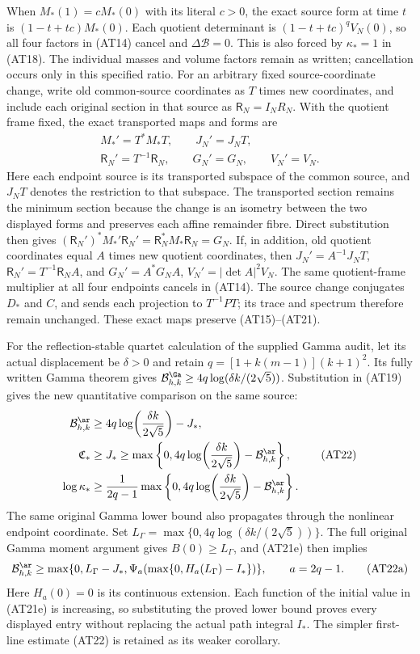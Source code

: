 When $M_*(1)=cM_*(0)$ with its literal $c>0$, the exact source
form at time $t$ is $(1-t+tc)M_*(0)$. Each quotient determinant
is $(1-t+tc)^qV_N(0)$, so all four factors in (AT14) cancel
and $\Delta\mathcal B=0$. This is also forced by
$\kappa_*=1$ in (AT18). The individual masses and volume
factors remain as written; cancellation occurs only in this
specified ratio. For an arbitrary fixed source-coordinate change, write old
common-source coordinates as $T$ times new coordinates, and include
each original section in that source as $\mathsf R_N=I_NR_N$.
With the quotient frame fixed, the exact transported maps and forms are
\[
 \begin{gathered}
 M_*'=T^*M_*T,\qquad J_N'=J_NT,\\
 \mathsf R_N'=T^{-1}\mathsf R_N,
 \qquad G_N'=G_N,\qquad V_N'=V_N.
 \end{gathered}
\]
Here each endpoint source is its transported subspace of the
common source, and $J_NT$ denotes the restriction to that subspace.
The transported section remains the minimum section because the
change is an isometry between the two displayed forms and preserves
each affine remainder fibre. Direct substitution then gives
$(\mathsf R_N')^*M_*'\mathsf R_N'=\mathsf R_N^*M_*\mathsf R_N=G_N$.
If, in addition,
old quotient coordinates equal $A$ times new quotient coordinates,
then $J_N'=A^{-1}J_NT$, $\mathsf R_N'=T^{-1}\mathsf R_NA$, and
$G_N'=A^*G_NA$, $V_N'=|\det A|^2V_N$.
The same quotient-frame multiplier at all four endpoints cancels
in (AT14). The source change conjugates $D_*$ and $C$, and sends
each projection to $T^{-1}PT$; its trace and spectrum therefore
remain unchanged. These exact maps preserve (AT15)--(AT21).

For the reflection-stable quartet calculation of the supplied
Gamma audit, let its actual displacement be $\delta>0$ and
retain $q=[1+k(m-1)](k+1)^2$. Its fully written Gamma theorem
gives $\mathcal B^\Ga_{h,k}\ge
4q\log(\delta k/(2\sqrt5))$. Substitution in (AT19) gives the
new quantitative comparison on the same source:
\[
\begin{aligned}
 \mathcal B^\ar_{h,k}&\ge
 4q\log\!\left(\frac{\delta k}{2\sqrt5}\right)-J_*,\\
 \mathfrak C_*&\ge J_*\ge\max\left\{0,
 4q\log\!\left(\frac{\delta k}{2\sqrt5}\right)-\mathcal B^\ar_{h,k}\right\},\\
 \log\kappa_*&\ge\frac{1}{2q-1}\max\left\{0,
 4q\log\!\left(\frac{\delta k}{2\sqrt5}\right)-\mathcal B^\ar_{h,k}\right\}.
\end{aligned}\tag{AT22}
\]
The same original Gamma lower bound also propagates through the
nonlinear endpoint coordinate. Set
$L_\Gamma=\max\{0,4q\log(\delta k/(2\sqrt5))\}$.
The full original Gamma moment argument gives $B(0)\ge L_\Gamma$,
and (AT21e) then implies
\[
\mathcal B^{\ar}_{h,k}\ge
\max\{0,L_\Gamma-J_*,
 \Psi_a(\max\{0,H_a(L_\Gamma)-I_*\})\},\qquad a=2q-1.
\tag{AT22a}
\]
Here $H_a(0)=0$ is its continuous extension. Each function of the
initial value in (AT21e) is increasing, so substituting the proved
lower bound proves every displayed entry without replacing the
actual path integral $I_*$. The simpler first-line estimate (AT22)
is retained as its weaker corollary.


